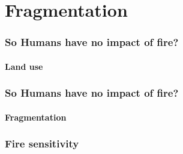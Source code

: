 \section{Fragmentation}

\begin{frame}
    \frametitle{So Humans have no impact of fire?}
    \framesubtitle{Land use}
\end{frame}

\begin{frame}
    \frametitle{So Humans have no impact of fire?}
    \framesubtitle{Fragmentation}
\end{frame}


\begin{frame}
    \frametitle{Fire sensitivity}
\end{frame}
